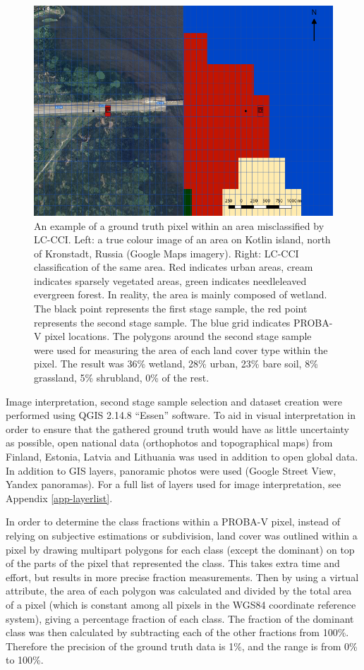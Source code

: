 \documentclass[a4paper,10pt]{book}
\begin{document}
\begin{figure}
 \includegraphics[width=\textwidth]{./thesis-figures/classification-example.png}
 \caption{An example of a ground truth pixel within an area misclassified by LC-CCI. Left: a true colour image of an area on Kotlin island, north of Kronstadt, Russia (Google Maps imagery). Right: LC-CCI classification of the same area. Red indicates urban areas, cream indicates sparsely vegetated areas, green indicates needleleaved evergreen forest. In reality, the area is mainly composed of wetland. The black point represents the first stage sample, the red point represents the second stage sample. The blue grid indicates PROBA-V pixel locations. The polygons around the second stage sample were used for measuring the area of each land cover type within the pixel. The result was 36\% wetland, 28\% urban, 23\% bare soil, 8\% grassland, 5\% shrubland, 0\% of the rest.}
 \label{fig-sampling}
\end{figure}

Image interpretation, second stage sample selection and dataset creation were performed using QGIS 2.14.8 ``Essen'' software. To aid in visual interpretation in order to ensure that the gathered ground truth would have as little uncertainty as possible, open national data (orthophotos and topographical maps) from Finland, Estonia, Latvia and Lithuania was used in addition to open global data. In addition to GIS layers, panoramic photos were used (Google Street View, Yandex panoramas). For a full list of layers used for image interpretation, see Appendix \ref{app-layerlist}.

In order to determine the class fractions within a PROBA-V pixel, instead of relying on subjective estimations or subdivision, land cover was outlined within a pixel by drawing multipart polygons for each class (except the dominant) on top of the parts of the pixel that represented the class. This takes extra time and effort, but results in more precise fraction measurements. Then by using a virtual attribute, the area of each polygon was calculated and divided by the total area of a pixel (which is constant among all pixels in the WGS84 coordinate reference system), giving a percentage fraction of each class. The fraction of the dominant class was then calculated by subtracting each of the other fractions from 100\%. Therefore the precision of the ground truth data is 1\%, and the range is from 0\% to 100\%.
\end{document}
